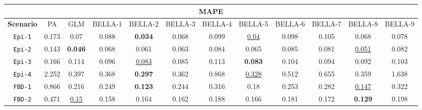\begin{landscape}
    \begin{table}[h!]
        \centering
        \begin{tabular}{cccccccccccc}
            \toprule

            \multicolumn{12}{c}{\textbf{MAPE}}                                                                                                                                                                                                                                                                                                      \\
            \midrule

            \textbf{Scenario} & PA                     & GLM                     & BELLA-1                     & BELLA-2                     & BELLA-3                     & BELLA-4                     & BELLA-5                     & BELLA-6                     & BELLA-7                     & BELLA-8                     & BELLA-9                     \\
            \midrule

            \texttt{Epi-1}    & 0.173   & 0.07   & 0.088   & \textbf{0.034}   & 0.068   & 0.099   & \underline{0.04}   & 0.098   & 0.105   & 0.068   & 0.078   \\[6pt]

            \texttt{Epi-2}    & 0.143   & \textbf{0.046}   & 0.068   & 0.061   & 0.063   & 0.084   & 0.065   & 0.085   & 0.081   & \underline{0.051}   & 0.082   \\[6pt]

            \texttt{Epi-3}    & 0.166   & 0.114   & 0.096   & \underline{0.083}   & 0.085   & 0.113   & \textbf{0.083}   & 0.104   & 0.094   & 0.092   & 0.103   \\[6pt]

            \texttt{Epi-4}    & 2.252   & 0.397   & 0.368   & \textbf{0.297}   & 0.362   & 0.868   & \underline{0.328}   & 0.512   & 0.655   & 0.359   & 1.638   \\[6pt]

            \texttt{FBD-1}    & 0.866 & 0.216 & 0.249 & \textbf{0.123} & 0.244 & 0.316 & 0.18 & 0.253 & 0.282 & \underline{0.147} & 0.322 \\[6pt]

            \texttt{FBD-2}    & 0.471 & \underline{0.15} & 0.158 & 0.164 & 0.162 & 0.188 & 0.166 & 0.181 & 0.172 & \textbf{0.129} & 0.198 \\[6pt]


\end{tabular}
\end{table}
\end{landscape}
